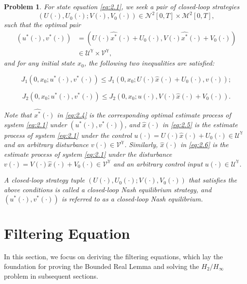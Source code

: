 \documentclass[10pt,a4paper]{amsart}
\newtheorem{pro}{Problem}
\begin{document}
\begin{pro}\label{pro:2.3}
	For state equation \eqref{eq:2.1}, we seek a pair of closed-loop strategies
	\begin{equation*}
		(U(\cdot),U_0(\cdot);V(\cdot),V_0(\cdot)) \in \mathcal{N}^2[0,T] \times \mathcal{M}^2[0,T],
	\end{equation*}
	such that the optimal pair
	\begin{equation}\label{eq:2.4}
		\begin{aligned}
			(u^*(\cdot),v^*(\cdot))
			&= (U(\cdot)\widehat{x^*}(\cdot) + U_0(\cdot),V(\cdot)\widehat{x^*}(\cdot) + V_0(\cdot)) \\
			&\in \mathcal{U}^{\mathbb{Y}} \times \mathcal{V}^{\mathbb{Y}},
		\end{aligned}
	\end{equation}
	and for any initial state $x_0$, the following two inequalities are satisfied:

	\begin{equation}\label{eq:2.5}
		J_1(0,x_0;u^*(\cdot),v^*(\cdot)) \leq J_1(0,x_0;U(\cdot)\widehat{x}(\cdot) + U_0(\cdot),v(\cdot));
	\end{equation}

	\begin{equation}\label{eq:2.6}
		J_2(0,x_0;u^*(\cdot),v^*(\cdot)) \leq J_2(0,x_0;u(\cdot),V(\cdot)\widehat{x}(\cdot) + V_0(\cdot)).
	\end{equation}
	
	Note that $\widehat{x^*}(\cdot)$ in \eqref{eq:2.4} is the corresponding optimal estimate process of system \eqref{eq:2.1} under $(u^*(\cdot),v^*(\cdot))$, and $\widehat{x}(\cdot)$ in \eqref{eq:2.5} is the estimate process of system \eqref{eq:2.1} under the control $u(\cdot) = U(\cdot)\widehat{x}(\cdot) + U_0(\cdot) \in \mathcal{U}^{\mathbb{Y}}$ and an arbitrary disturbance $v(\cdot) \in \mathcal{V}^{\mathbb{Y}}$. Similarly, $\widehat{x}(\cdot)$ in \eqref{eq:2.6} is the estimate process of system \eqref{eq:2.1} under the disturbance $v(\cdot) = V(\cdot)\widehat{x}(\cdot) + V_0(\cdot) \in \mathcal{V}^{\mathbb{Y}}$ and an arbitrary control input $u(\cdot) \in \mathcal{U}^{\mathbb{Y}}$.
	
	A closed-loop strategy tuple $(U(\cdot),U_0(\cdot);V(\cdot),V_0(\cdot))$ that satisfies the above conditions is called a closed-loop Nash equilibrium strategy, and $(u^*(\cdot),v^*(\cdot))$ is referred to as a closed-loop Nash equilibrium.
\end{pro}


\section{Filtering Equation}\label{sec3}
In this section, we focus on deriving the filtering equations, which lay the foundation for proving the Bounded Real Lemma and solving the $H_2/H_\infty$ problem in subsequent sections.
\end{document}
